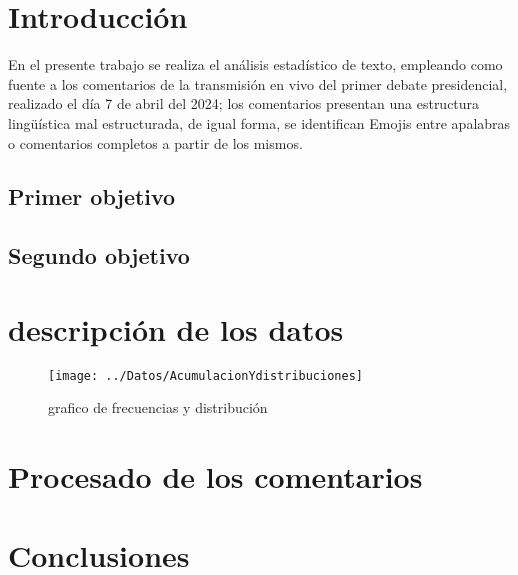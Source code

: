 \chapter{Introducción}

En el presente trabajo se realiza el análisis estadístico de texto, empleando como fuente a los comentarios de la transmisión en vivo del primer debate presidencial, realizado el día 7 de abril del 2024; los comentarios presentan una estructura lingüística mal estructurada, de igual forma, se identifican Emojis entre apalabras o comentarios completos a partir de los mismos.\\


\section{Primer objetivo}

\section{Segundo objetivo}


\chapter{descripción de los datos}



\begin{figure}[!h]
	\centering
	\texttt{[image: ../Datos/AcumulacionYdistribuciones]}
	\caption{grafico de frecuencias y distribución}
	\label{fig:FyD}
\end{figure}

\chapter{Procesado de los comentarios}





\chapter{Conclusiones}

